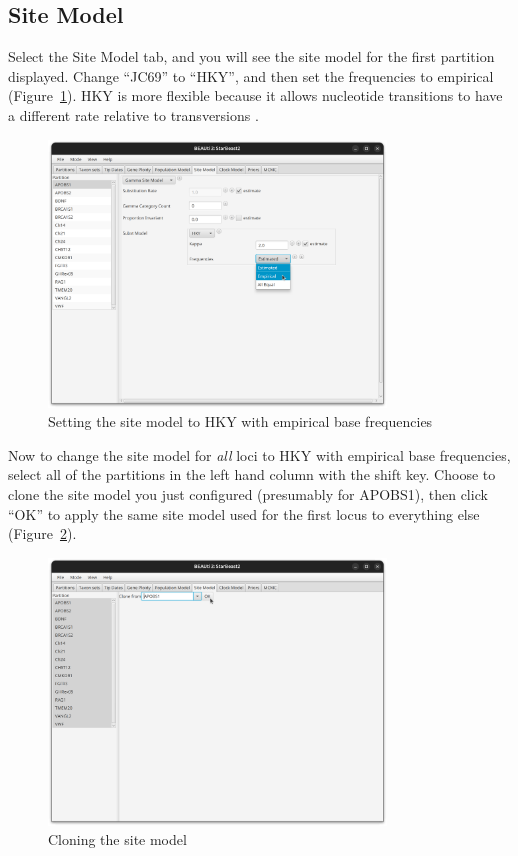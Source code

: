 \documentclass[12pt]{article}
\begin{document}
\clearpage

\subsection{Site Model}
\label{subsec:siteModel}

Select the Site Model tab, and you will see the site model for the first partition
displayed. Change ``JC69'' to ``HKY'', and then set the frequencies to
empirical (Figure~\ref{fig:hky}).
HKY is more flexible because it allows nucleotide transitions to have a different
rate relative to transversions \parencite{Hasegawa1985}.

\begin{figure}[htb!]
\centering
\includegraphics[width=0.8\textwidth]{figures/hky.png}
\caption
{Setting the site model to HKY with empirical base frequencies}
\label{fig:hky}
\end{figure}

Now to change the site model for \textit{all} loci to HKY with empirical base frequencies,
select all of the partitions in the left hand column with the shift key. Choose to clone the site model you just configured (presumably for APOBS1), then
click ``OK'' to apply the same site model used for the first locus
to everything else (Figure~\ref{fig:cloneSiteModel}).

\begin{figure}[htb!]
\centering
\includegraphics[width=0.8\textwidth]{figures/cloneSiteModel.png}
\caption
{Cloning the site model}
\label{fig:cloneSiteModel}
\end{figure}
\end{document}
